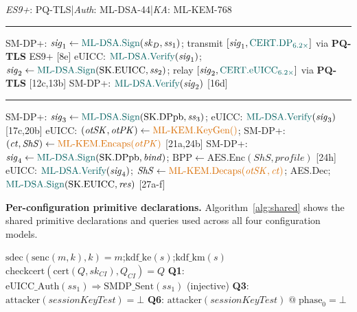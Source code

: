 \documentclass[a4paper,fleqn]{cas-sc}
\begin{document}
\begin{algorithm}[H]
\caption{Config (d): Full PQC: \textcolor{cfgD}{ML-DSA-44} + \textcolor{cfgC}{ML-KEM-768} + \textcolor{cfgB}{PQ-TLS}}
\label{alg:flow-d}
\footnotesize
\begin{algorithmic}[1]
\Statex \textcolor{cfgB}{\textit{ES9+}: PQ-TLS}\enspace|\enspace\textcolor{cfgD}{\textit{Auth}: ML-DSA-44}\enspace|\enspace\textcolor{cfgC}{\textit{KA}: ML-KEM-768}
\Statex \rule{0.95\linewidth}{0.2pt}
\State SM-DP+: $\mathit{sig}_1\gets\textcolor{cfgD}{\text{ML-DSA.Sign}}(\mathit{sk}_D,\mathit{ss}_1)$; transmit $[\mathit{sig}_1,\textcolor{cfgD}{\mathrm{CERT.DP}_{6.2\times}}]$ via \textcolor{cfgB}{\textbf{PQ-TLS}} ES9+ {\color{gray}[8e]}
\State eUICC: $\textcolor{cfgD}{\text{ML-DSA.Verify}}(\mathit{sig}_1)$; $\mathit{sig}_2\gets\textcolor{cfgD}{\text{ML-DSA.Sign}}(\mathrm{SK.EUICC},\mathit{ss}_2)$; relay $[\mathit{sig}_2,\textcolor{cfgD}{\mathrm{CERT.eUICC}_{6.2\times}}]$ via \textcolor{cfgB}{\textbf{PQ-TLS}} {\color{gray}[12c,13b]}
\State SM-DP+: $\textcolor{cfgD}{\text{ML-DSA.Verify}}(\mathit{sig}_2)$ {\color{gray}[16d]}
\Statex \rule{0.95\linewidth}{0.2pt}
\State SM-DP+: $\mathit{sig}_3\gets\textcolor{cfgD}{\text{ML-DSA.Sign}}(\mathrm{SK.DPpb},\mathit{ss}_3)$; eUICC: $\textcolor{cfgD}{\text{ML-DSA.Verify}}(\mathit{sig}_3)$ {\color{gray}[17c,20b]}
\State eUICC: $(\mathit{otSK},\mathit{otPK})\gets\textcolor{cfgC}{\text{ML-KEM.KeyGen}()}$; SM-DP+: $(\mathit{ct},\mathit{ShS})\gets\textcolor{cfgC}{\text{ML-KEM.Encaps}(\mathit{otPK})}$ {\color{gray}[21a,24b]}
\State SM-DP+: $\mathit{sig}_4\gets\textcolor{cfgD}{\text{ML-DSA.Sign}}(\mathrm{SK.DPpb},\mathit{bind})$; $\mathrm{BPP}\gets\text{AES.Enc}(\mathit{ShS},\mathit{profile})$ {\color{gray}[24h]}
\State eUICC: $\textcolor{cfgD}{\text{ML-DSA.Verify}}(\mathit{sig}_4)$; $\mathit{ShS}\gets\textcolor{cfgC}{\text{ML-KEM.Decaps}(\mathit{otSK},\mathit{ct})}$; AES.Dec; $\textcolor{cfgD}{\text{ML-DSA.Sign}}(\mathrm{SK.EUICC},\mathit{res})$ {\color{gray}[27a-f]}
\end{algorithmic}
\end{algorithm}

\noindent\textbf{Per-configuration primitive declarations.}
Algorithm~\ref{alg:shared} shows the
shared primitive declarations and queries used across all four configuration models.

\begin{algorithm}[H]
\caption{Shared primitives and queries (all configurations)}
\label{alg:shared}
\footnotesize
\begin{algorithmic}[1]
\State $\mathrm{sdec}(\mathrm{senc}(m,k),k)=m$;\enspace $\mathrm{kdf\_ke}(s)$;\enspace $\mathrm{kdf\_km}(s)$
\State $\mathrm{checkcert}(\mathrm{cert}(Q,\mathit{sk}_{CI}),Q_{CI})=Q$
\State \textbf{Q1}: $\mathrm{eUICC\_Auth}(ss_1)\Rightarrow\mathrm{SMDP\_Sent}(ss_1)$ (injective)
\State \textbf{Q3}: $\mathrm{attacker}(\mathit{sessionKeyTest})=\bot$
\State \textbf{Q6}: $\mathrm{attacker}(\mathit{sessionKeyTest})\;@\;\mathrm{phase}_0=\bot$
\end{algorithmic}
\end{algorithm}
\end{document}
